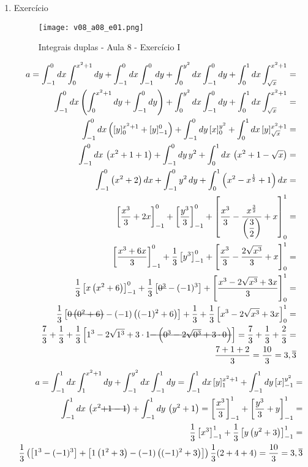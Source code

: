 \begin{enumerate}
	\item Exercício
	
	\begin{figure}[htb]
		\caption{Integrais duplas - Aula 8 - Exercício I}
		\label{v08_a08_e01}
		\centering
		\texttt{[image: v08\_a08\_e01.png]}		
	\end{figure}
	
	\begin{align*}
		a = \int_{-1}^0 dx \int_0^{x^2 + 1} dy + \int_{-1}^0 dx \int_{-1}^0 dy + \int_0^{y^2} dx \int_{-1}^0 dy + \int_0^1 dx \int_{\sqrt{x}}^{x^2 + 1} =\\ \int_{-1}^0 dx\left(\int_0^{x^2 + 1} dy + \int_{-1}^0 dy\right)  + \int_0^{y^2} dx \int_{-1}^0 dy + \int_0^1 dx \int_{\sqrt{x}}^{x^2 + 1} =\\ \int_{-1}^0 dx \left([y]_0^{x^2 + 1} + [y]_{-1}^0\right)  + \int_{-1}^0 dy\, [x]_0^{y^2} + \int_0^1 dx\, [y]_{\sqrt{x}}^{x^2 + 1} =\\ \int_{-1}^0 dx\, \left(x^2 + 1 + 1\right) + \int_{-1}^0 dy\, y^2 + \int_0^1 dx\, \left(x^2 + 1 - \sqrt{x}\right) =\\ \int_{-1}^0 \left(x^2 + 2\right) dx + \int_{-1}^0 y^2\, dy + \int_0^1 \left(x^2 - x^{\frac{1}{2}} + 1\right) dx =\\ \left[\dfrac{x^3}{3} + 2x\right]_{-1}^0 + \left[\dfrac{y^3}{3}\right]_{-1}^0 + \left[\dfrac{x^3}{3} - \dfrac{x^{\frac{3}{2}}}{\left(\dfrac{3}{2}\right)} + x\right]_0^1 =\\ \left[\dfrac{x^3 + 6x}{3}\right]_{-1}^0 + \dfrac{1}{3}\left[y^3\right]_{-1}^0 + \left[\dfrac{x^3}{3} - \dfrac{2\sqrt{x^3}}{3} + x\right]_0^1 =\\ \dfrac{1}{3}\left[x\left(x^2 + 6\right)\right]_{-1}^0 + \dfrac{1}{3}\left[\overstrike{0^3} - (-1)^3\right] + \left[\dfrac{x^3 - 2\sqrt{x^3} + 3x}{3}\right]_0^1 =\\ \dfrac{1}{3}\left[\overstrike{0\left(0^2 + 6\right)} - (-1)\left((-1)^2 + 6\right)\right] + \dfrac{1}{3} + \dfrac{1}{3}\left[x^3 - 2\sqrt{x^3} + 3x\right]_0^1 =\\ \dfrac{7}{3} + \dfrac{1}{3} + \dfrac{1}{3}\left[1^3 - 2\sqrt{1^3} + 3\cdot1 \overstrike{- \left(0^3 - 2\sqrt{0^3} + 3\cdot0\right)}\right] = \dfrac{7}{3} + \dfrac{1}{3} + \dfrac{2}{3} =\\ \dfrac{7 + 1 + 2}{3} = \dfrac{10}{3} = 3,\overline{3}	
	\end{align*}	
	\begin{align*}
		a = \int_{-1}^1 dx \int_1^{x^2 + 1} dy + \int_{-1}^{y^2} dx \int_{-1}^1 dy = \int_{-1}^1 dx\, [y]_1^{x^2 + 1} + \int_{-1}^1 dy\, [x]_{-1}^{y^2} =\\ \int_{-1}^1 dx\, \left(x^2 \overstrike{+ 1 - 1}\right) + \int_{-1}^1 dy\, \left(y^2 + 1\right) = \left[\dfrac{x^3}{3}\right]_{-1}^1 + \left[\dfrac{y^3}{3} + y\right]_{-1}^1 =\\ \dfrac{1}{3}\left[x^3\right]_{-1}^1 + \dfrac{1}{3}\left[y\left(y^2 + 3\right)\right]_{-1}^1 =\\ \dfrac{1}{3}\left(\left[1^3 - (-1)^3\right] + \left[1\left(1^2 + 3\right) - (-1)\left((-1)^2 + 3\right)\right]\right)\dfrac{1}{3}(2 + 4 + 4) = \frac{10}{3} = 3,\overline{3}
	\end{align*}
\end{enumerate}